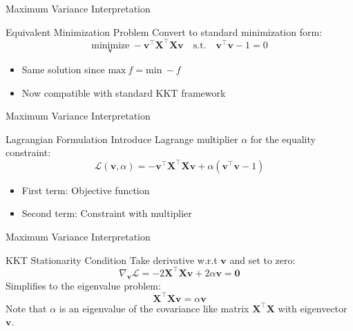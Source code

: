 \documentclass{beamer}
\begin{document}
\begin{frame}{Maximum Variance Interpretation}
    \begin{block}{Equivalent Minimization Problem}
        Convert to standard minimization form:
        \[
        \underset{\mathbf{v}}{\text{minimize}}\ -\mathbf{v}^\top \mathbf{X}^\top \mathbf{X} \mathbf{v} \quad \text{s.t.}\quad \mathbf{v}^\top \mathbf{v} - 1 = 0
        \]
        \begin{itemize}
            \item Same solution since $\text{max}\ f = \text{min}\ -f$
            \item Now compatible with standard KKT framework
        \end{itemize}
    \end{block}
\end{frame}

\begin{frame}{Maximum Variance Interpretation}
    \begin{block}{Lagrangian Formulation}
        Introduce Lagrange multiplier $\alpha$ for the equality constraint:
        \[
        \mathcal{L}(\mathbf{v}, \alpha) = -\mathbf{v}^\top \mathbf{X}^\top \mathbf{X} \mathbf{v} + \alpha(\mathbf{v}^\top \mathbf{v} - 1)
        \]
        \begin{itemize}
            \item First term: Objective function
            \item Second term: Constraint with multiplier
        \end{itemize}
    \end{block}
\end{frame}

\begin{frame}{Maximum Variance Interpretation}
    \begin{block}{KKT Stationarity Condition}
        Take derivative w.r.t $\mathbf{v}$ and set to zero:
        \[
        \nabla_{\mathbf{v}} \mathcal{L} = -2\mathbf{X}^\top \mathbf{X} \mathbf{v} + 2\alpha \mathbf{v} = \mathbf{0}
        \]
        Simplifies to the eigenvalue problem:
        \[
        \mathbf{X}^\top \mathbf{X} \mathbf{v} = \alpha \mathbf{v}
        \]
    Note that $\alpha$ is an eigenvalue of the covariance like matrix $ \mathbf{X}^\top \mathbf{X}$ with eigenvector $\mathbf{v}$. 
    \end{block}
\end{frame}
\end{document}
